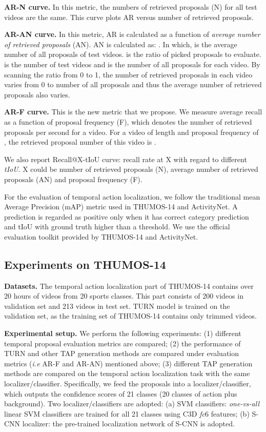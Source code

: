 \documentclass[10pt,twocolumn,letterpaper]{article}
\begin{document}
 \textbf{AR-N curve.} In this metric, the numbers of retrieved proposals (N) for all test videos are the same. This curve plots AR versus number of retrieved proposals. 
 
 \textbf{AR-AN curve.} In this metric, AR is calculated as a function of \textit{average number of retrieved proposals} (AN).  AN is calculated as:
    . In which,  is the average number of all proposals of test videos.  is the ratio of picked proposals to evaluate.  is the number of test videos and  is the number of all proposals for each video. By scanning the ratio  from 0 to 1, the number of retrieved proposals in each video varies from 0 to number of all proposals and thus the average number of retrieved proposals also varies.
 
 \textbf{AR-F curve.} This is the new metric that we propose. We measure average recall as a function of proposal frequency (F), which denotes the number of retrieved proposals per second for a video. For a video of length  and proposal frequency of , the retrieved proposal number of this video is .
 
 We also report Recall@X-tIoU curve: recall rate at X with regard to different \textit{tIoU}. X could be number of retrieved proposals (N), average number of retrieved proposals (AN) and proposal frequency (F).

 For the evaluation of temporal action localization, we follow the traditional mean Average Precision (mAP) metric used in THUMOS-14 and ActivityNet. A prediction is regarded as positive only when it has correct category prediction and tIoU with ground truth higher than a threshold. We use the official evaluation toolkit provided by THUMOS-14 and ActivityNet.
 
\subsection{Experiments on THUMOS-14} 
\label{chap:4.2}
\textbf{Datasets.} The temporal action localization part of THUMOS-14 contains over 20 hours of videos from 20 sports classes. This part consists of 200 videos in validation set and 213 videos in test set. TURN model is trained on the validation set, as the training set of THUMOS-14 contains only trimmed videos. 

\textbf{Experimental setup.} \label{sec: setup} We perform the following experiments: (1) different temporal proposal evaluation metrics are compared; (2) the performance of TURN and other TAP generation methods are compared under evaluation metrics  (\emph{i.e} AR-F and AR-AN) mentioned above; (3) different TAP generation methods are compared on the temporal action localization task with the same localizer/classifier. Specifically, we feed the proposals into a localizer/classifier, which outputs the confidence scores of 21 classes (20 classes of action plus background). Two localizer/classifiers are adopted: (a) SVM classifiers: \textit{one-vs-all} linear SVM classifiers are trained for all 21 classes using C3D \textit{fc}6 features; (b) S-CNN localizer: the pre-trained localization network of S-CNN \cite{Shou_2016_CVPR} is adopted. \label{sec: exp setup}
\end{document}
